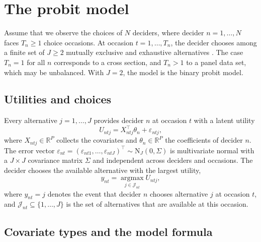 \documentclass[article,shortnames]{jss}
\begin{document}
\section{The probit model} \label{sec:model}

Assume that we observe the choices of $N$ deciders, where decider
$n = 1, \dots, N$ faces $T_n \geq 1$ choice occasions. At occasion
$t = 1, \dots, T_n$, the decider chooses among a finite set of $J \geq 2$
mutually exclusive and exhaustive alternatives \citep[Chapter~2]{Train2009}. The
case $T_n = 1$ for all $n$ corresponds to a cross section, and $T_n > 1$ to a
panel data set, which may be unbalanced. With $J = 2$, the model is the binary
probit model.

\subsection{Utilities and choices} \label{sec:model:utility}

Every alternative $j = 1, \dots, J$ provides decider $n$ at occasion $t$ with a
latent utility
%
\begin{equation}
  \label{eq:utility}
  U_{ntj} = X_{ntj}^\top \theta_n + \varepsilon_{ntj},
\end{equation}
%
where $X_{ntj} \in \mathbb{R}^P$ collects the covariates and $\theta_n \in
\mathbb{R}^P$ the coefficients of decider $n$. The error vector
$\varepsilon_{nt} = (\varepsilon_{nt1}, \dots, \varepsilon_{ntJ})^\top \sim
\mathrm{N}_J(0, \Sigma)$ is multivariate normal with a $J \times J$ covariance
matrix $\Sigma$ and independent across deciders and occasions. The decider
chooses the available alternative with the largest utility,
%
\begin{equation}
  \label{eq:link}
  y_{nt} = \operatorname*{argmax}_{j \in \mathcal{J}_{nt}} U_{ntj},
\end{equation}
%
where $y_{nt} = j$ denotes the event that decider $n$ chooses alternative $j$ at
occasion $t$, and $\mathcal{J}_{nt} \subseteq \{1, \dots, J\}$ is the set of
alternatives that are available at this occasion.

\subsection{Covariate types and the model formula} \label{sec:model:formula}
\end{document}
